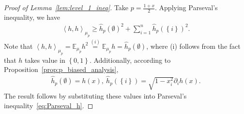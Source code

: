 \documentclass[11pt]{article}
\theoremstyle{named}
\theoremstyle{plain}
\newcommand{\Exs}{\ensuremath{{\mathbb{E}}}}
\newcommand{\braces}[1]{\left\{ #1 \right \}}
\newcommand{\angles}[1]{\left\langle #1 \right \rangle}
\begin{document}
\begin{proof}[Proof of Lemma~\ref{lem:level_1_ineq}\label{proof_lem:level_1_ineq}]
Take $p = \frac{1+x}{2}$. Applying Parseval's inequality, we have
\begin{align}
  \label{eq:Parseval_h}
  \angles{h ,h}_{\mu_p} \geq \hat{h}_p(\emptyset)^2 + \sum_{i=1}^n \hat{h}_{p}(\braces{i})^2.
\end{align}
Note that $\angles{h ,h}_{\mu_p} = \Exs_{\mu_p} h^2 \overset{(i)}{=}  \Exs_{\mu_p} h = \hat{h}_p(\emptyset)$, where (i) follows from the fact that $h$ takes value in $\braces{0, 1}$. Additionally, according to Proposition~\ref{prop:p_biased_analysis}, 
\begin{align*}
  \hat{h}_p(\emptyset) = h(x), \ \hat{h}_p(\braces{i}) = \sqrt{1-x_i^2} \partial_i h(x).
\end{align*}
The result follows by substituting these values into Parseval's inequality~\eqref{eq:Parseval_h}. 
\end{proof}
\end{document}
